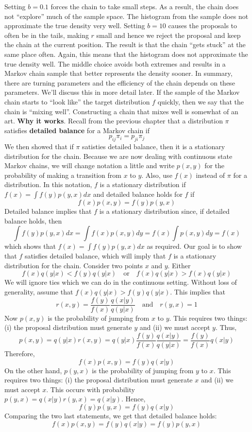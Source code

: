 Setting \(b = 0.1\) forces the chain to take small steps. As a result,
the chain does not ``explore'' much of the sample space. The histogram
from the sample does not approximate the true density very well. Setting
\(b = 10\) causes the proposals to often be in the tails, making \(r\)
small and hence we reject the proposal and keep the chain at the current
position. The result is that the chain ``gets stuck'' at the same place
often. Again, this means that the histogram does not approximate the
true density well. The middle choice avoids both extremes and results in
a Markov chain sample that better represents the density sooner. In
summary, there are turning parameters and the efficiency of the chain
depends on these parameters. We'll discuss this in more detail later.
If the sample of the Markov chain starts to ``look like'' the target
distribution \(f\) quickly, then we say that the chain is ``mixing
well''. Constructing a chain that mixes well is somewhat of an art.
\textbf{Why it works}. Recall from the previous chapter that a
distribution \(\pi\) satisfies \textbf{detailed balance} for a Markov
chain if
\[
p_{ij} \pi_{i} = p_{ji} \pi_{j}
\]
We then showed that if \(\pi\) satisties detailed balance, then it is a
stationary distribution for the chain.
Because we are now dealing with continuous state Markov chains, we will
change notation a little and write \(p(x, y)\) for the probability of
making a transition from \(x\) to \(y\). Also,  use \(f(x)\)
instead of \(\pi\) for a distribution. In this notation, \(f\) is a
stationary distribution if \(f(x) = \int f(y) p(y, x) dx\) and detailed
balance holds for \(f\) if
\[
f(x) p(x, y) = f(y) p(y, x)
\]
Detailed balance implies that \(f\) is a stationary distribution since,
if detailed balance holds, then
\[
\int f(y) p(y, x) dx = \int f(x) p(x, y) dy = f(x) \int p(x, y) dy = f(x)
\]
which shows that \(f(x) = \int f(y) p(y, x) dx\) as required. Our goal
is to show that \(f\) satisfies detailed balance, which will imply that
\(f\) is a stationary distribution for the chain.
Consider two points \(x\) and \(y\). Either
\[
f(x) q(y | x) < f(y) q(y | x)
\quad \text{or} \quad
f(x) q(y | x) > f(x) q(y | x)
\]
We will ignore ties which we can do in the continuous setting. Without
loss of generality, assume that \(f(x) q(y | x) > f(y) q(y | x)\). This
implies that
\[
r(x, y) = \frac{f(y)}{f(x)} \frac{q(x | y)}{q(y | x)} 
\quad \text{and} \quad
r(y, x) = 1
\]
Now \(p(x, y)\) is the probability of jumping from \(x\) to \(y\). This
requires two things: (i) the proposal distribution must generate \(y\)
and (ii) we must accept \(y\). Thus,
\[
p(x, y) = q(y | x) r(x, y) =  q(y | x) \frac{f(y)}{f(x)} \frac{q(x | y)}{q(y | x)} = \frac{f(y)}{f(x)} q(x | y)
\]
Therefore,
\[
f(x) p(x, y) = f(y) q(x | y)
\]
On the other hand, \(p(y, x)\) is the probability of jumping from \(y\)
to \(x\). This requires two things: (i) the proposal distribution must
generate \(x\) and (ii) we must accept \(x\). This occurs with
probability \(p(y, x) = q(x | y) r(y, x) = q(x | y)\). Hence,
\[
f(y) p(y, x) = f(y) q(x | y)
\]
Comparing the two last statements, we get that detailed balance holds:
\[
f(x) p(x, y) = f(y) q(x | y) = f(y) p(y, x)
\]

